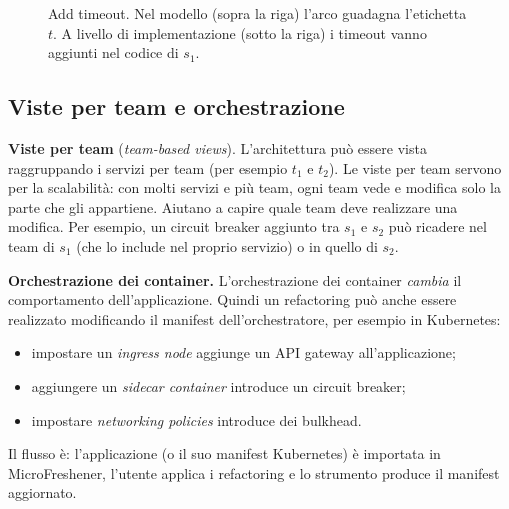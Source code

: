 \begin{figure}[ht]
\centering
{}
\caption{Add timeout. Nel modello (sopra la riga) l'arco guadagna l'etichetta $t$. A livello di implementazione (sotto la
riga) i timeout vanno aggiunti nel codice di $s_1$.}
\label{fig:smell-modello}
\end{figure}

\subsection{Viste per team e orchestrazione}

\textbf{Viste per team} (\emph{team-based views}). L'architettura può essere vista raggruppando i servizi per team
(per esempio $t_1$ e $t_2$). Le viste per team servono per la scalabilità: con molti servizi e più team, ogni team vede e
modifica solo la parte che gli appartiene. Aiutano a capire quale team deve realizzare una modifica. Per esempio, un
circuit breaker aggiunto tra $s_1$ e $s_2$ può ricadere nel team di $s_1$ (che lo include nel proprio servizio) o in
quello di $s_2$.

\textbf{Orchestrazione dei container.} L'orchestrazione dei container \emph{cambia} il comportamento
dell'applicazione. Quindi un refactoring può anche essere realizzato modificando il manifest dell'orchestratore, per
esempio in Kubernetes:
\begin{itemize}
  \item impostare un \emph{ingress node} aggiunge un API gateway all'applicazione;
  \item aggiungere un \emph{sidecar container} introduce un circuit breaker;
  \item impostare \emph{networking policies} introduce dei bulkhead.
\end{itemize}
Il flusso è: l'applicazione (o il suo manifest Kubernetes) è importata in MicroFreshener, l'utente applica i refactoring
e lo strumento produce il manifest aggiornato.

